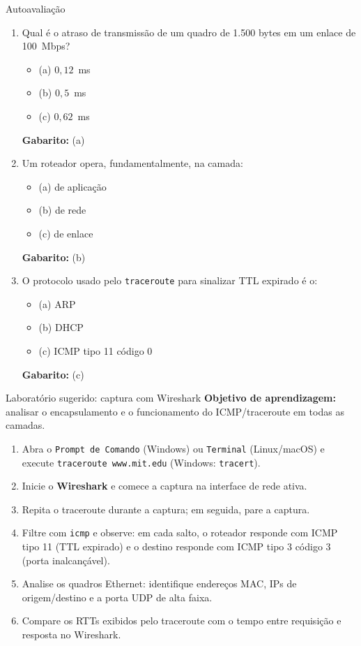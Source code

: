 \documentclass[aspectratio=169,11pt]{beamer}
\begin{document}
\begin{frame}{Autoavaliação}
  \begin{enumerate}
    \item Qual é o atraso de transmissão de um quadro de 1.500 bytes em um enlace de 100~Mbps?
      \begin{itemize}
        \item (a) $0{,}12$~ms
        \item (b) $0{,}5$~ms
        \item (c) $0{,}62$~ms
      \end{itemize}
      \pause
      \textbf{Gabarito:} (a)

    \item Um roteador opera, fundamentalmente, na camada:
      \begin{itemize}
        \item (a) de aplicação
        \item (b) de rede
        \item (c) de enlace
      \end{itemize}
      \pause
      \textbf{Gabarito:} (b)

    \item O protocolo usado pelo \texttt{traceroute} para sinalizar TTL expirado é o:
      \begin{itemize}
        \item (a) ARP
        \item (b) DHCP
        \item (c) ICMP tipo 11 código 0
      \end{itemize}
      \pause
      \textbf{Gabarito:} (c)
  \end{enumerate}
\end{frame}

\begin{frame}{Laboratório sugerido: captura com Wireshark}
  \textbf{Objetivo de aprendizagem:} analisar o encapsulamento e o funcionamento do ICMP/traceroute em todas as camadas.
  \begin{enumerate}
    \item Abra o \texttt{Prompt de Comando} (Windows) ou \texttt{Terminal} (Linux/macOS) e execute \texttt{traceroute www.mit.edu} (Windows: \texttt{tracert}).
    \item Inicie o \textbf{Wireshark} e comece a captura na interface de rede ativa.
    \item Repita o traceroute durante a captura; em seguida, pare a captura.
    \item Filtre com \texttt{icmp} e observe: em cada salto, o roteador responde com ICMP tipo 11 (TTL expirado) e o destino responde com ICMP tipo 3 código 3 (porta inalcançável).
    \item Analise os quadros Ethernet: identifique endereços MAC, IPs de origem/destino e a porta UDP de alta faixa.
    \item Compare os RTTs exibidos pelo traceroute com o tempo entre requisição e resposta no Wireshark.
  \end{enumerate}
\end{frame}
\end{document}
